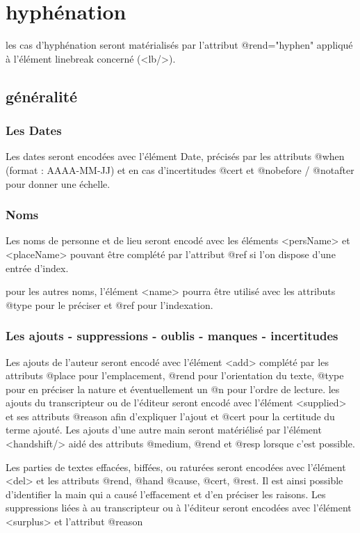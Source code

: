 \documentclass[12pt,a4paper,oneside]{book} %
\begin{document}
\section*{hyphénation}

les cas d'hyphénation seront matérialisés par l'attribut @rend="hyphen" appliqué à l'élément linebreak concerné (<lb/>).

\subsection*{généralité}
 
\subsubsection*{Les Dates}
Les dates seront encodées avec l'élément Date, précisés par les attributs @when (format : AAAA-MM-JJ) et en cas d'incertitudes @cert et @nobefore / @notafter pour donner une échelle. 

\subsubsection*{Noms}

Les noms de personne et de lieu seront encodé avec les éléments <persName> et <placeName> pouvant être complété par l'attribut @ref si l'on dispose d'une entrée d'index.

pour les autres noms, l'élément <name> pourra être utilisé avec les attributs @type pour le préciser et @ref pour l'indexation.

\subsubsection*{Les ajouts - suppressions - oublis - manques - incertitudes}

Les ajouts de l'auteur seront encodé avec l'élément <add> complété par les attributs @place pour l'emplacement, @rend pour l'orientation du texte, @type pour en préciser la nature et éventuellement un @n pour l'ordre de lecture. les ajouts du transcripteur ou de l'éditeur seront encodé avec l'élément <supplied> et ses attributs @reason afin d'expliquer l'ajout et @cert pour la certitude du terme ajouté. Les ajouts d'une autre main seront matériélisé par l'élément <handshift/> aidé des attributs @medium, @rend et @resp lorsque c'est possible.
\bigskip 

Les parties de textes effacées, biffées, ou raturées seront encodées avec l'élément <del> et les attributs @rend, @hand @cause, @cert, @rest. Il est ainsi possible d'identifier la main qui a causé l'effacement et d'en préciser les raisons. Les suppressions liées à au transcripteur ou à l'éditeur seront encodées avec l'élément <surplus> et l'attribut @reason
\bigskip 
\end{document}
